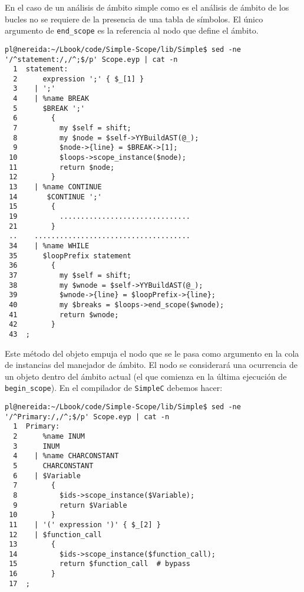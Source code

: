
En el caso de un análisis de ámbito simple como es el análisis de ámbito
de los bucles no se requiere de la presencia de una tabla de símbolos.
El único argumento de \verb|end_scope| es la referencia al nodo que define 
el ámbito. 

\begin{verbatim}
pl@nereida:~/Lbook/code/Simple-Scope/lib/Simple$ sed -ne '/^statement:/,/^;$/p' Scope.eyp | cat -n
  1  statement:
  2      expression ';' { $_[1] }
  3    | ';'
  4    | %name BREAK
  5      $BREAK ';'
  6        {
  7          my $self = shift;
  8          my $node = $self->YYBuildAST(@_);
  9          $node->{line} = $BREAK->[1];
 10          $loops->scope_instance($node);
 11          return $node;
 12        }
 13    | %name CONTINUE
 14       $CONTINUE ';'
 15        {
 19          ...............................
 21        }
 ..    .....................................
 34    | %name WHILE
 35      $loopPrefix statement
 36        {
 37          my $self = shift;
 38          my $wnode = $self->YYBuildAST(@_);
 39          $wnode->{line} = $loopPrefix->{line};
 40          my $breaks = $loops->end_scope($wnode);
 41          return $wnode;
 42        }
 43  ;
\end{verbatim}



Este método del objeto  empuja el nodo 
que se le pasa como argumento en la cola de instancias del 
manejador de ámbito.
El nodo se considerará una ocurrencia de un objeto dentro 
del ámbito actual (el que comienza en la última ejecución 
de \verb|begin_scope|).  En el compilador de \verb|SimpleC| debemos hacer:

\label{code:primary}
\begin{verbatim}
pl@nereida:~/Lbook/code/Simple-Scope/lib/Simple$ sed -ne '/^Primary:/,/^;$/p' Scope.eyp | cat -n
  1  Primary:
  2      %name INUM
  3      INUM
  4    | %name CHARCONSTANT
  5      CHARCONSTANT
  6    | $Variable
  7        {
  8          $ids->scope_instance($Variable);
  9          return $Variable
 10        }
 11    | '(' expression ')' { $_[2] }
 12    | $function_call
 13        {
 14          $ids->scope_instance($function_call);
 15          return $function_call  # bypass
 16        }
 17  ;
\end{verbatim}

